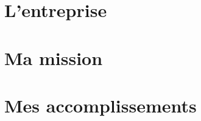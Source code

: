\documentclass[12pt]{report}
\begin{document}
	

	
	\tableofcontents
	
	\part{L'entreprise}
		
		
	\part{Ma mission}
		
		
	\part{Mes accomplissements}
		
\end{document}
